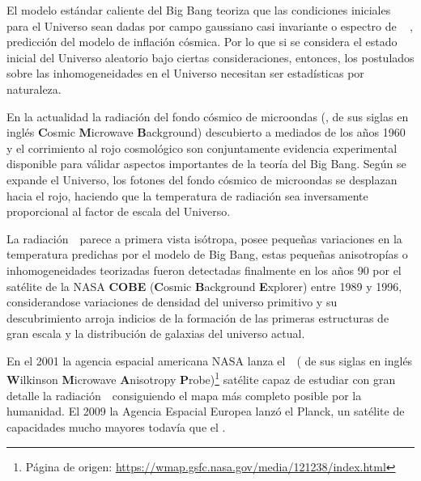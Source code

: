 El modelo estándar caliente del Big Bang teoriza que las condiciones iniciales para el Universo sean dadas por campo gaussiano casi invariante o espectro de \matterspectrum ~ \citep{rubakov_harrison--zeldovich_2009}, predicción del modelo de inflación cósmica. Por lo que si se considera el estado inicial del Universo aleatorio bajo ciertas consideraciones, entonces, los postulados sobre las inhomogeneidades en el Universo necesitan ser estadísticas por naturaleza. 

En la actualidad la radiación del fondo cósmico de microondas (\CMB, de sus siglas en inglés \textbf{C}osmic \textbf{M}icrowave \textbf{B}ackground) descubierto a mediados de los años 1960 y el corrimiento al rojo cosmológico son conjuntamente evidencia experimental disponible para válidar aspectos importantes de la teoría del Big Bang. %
Según se expande el Universo, los fotones del fondo cósmico de microondas se desplazan hacia el rojo, haciendo que la temperatura de radiación sea inversamente proporcional al factor de escala del Universo.

La radiación~\CMB~parece a primera vista isótropa, posee pequeñas variaciones en la temperatura predichas por el modelo de Big Bang, estas peque\~nas anisotropías o inhomogeneidades teorizadas fueron detectadas finalmente en los años 90 por el satélite de la NASA \textbf{COBE} (\textbf{C}osmic \textbf{B}ackground \textbf{E}xplorer) entre 1989 y 1996, considerandose variaciones de densidad del universo primitivo y su descubrimiento arroja indicios de la formación de las primeras estructuras de gran escala y la distribución de galaxias del universo actual. 

En el 2001 la agencia espacial americana NASA lanza el~\WMAP~( de sus siglas en inglés \textbf{W}ilkinson \textbf{M}icrowave \textbf{A}nisotropy \textbf{P}robe)\footnote{ Página de origen: \url{https://wmap.gsfc.nasa.gov/media/121238/index.html}} satélite capaz de estudiar con gran detalle la radiación~\CMB~consiguiendo el mapa más completo posible por la humanidad. %
El 2009 la Agencia Espacial Europea lanzó el Planck, un satélite de capacidades mucho mayores todavía que el \WMAP.

